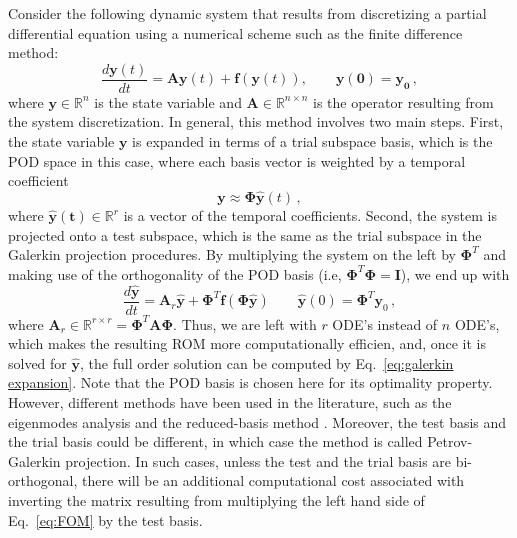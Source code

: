 \documentclass[]{interact}
\theoremstyle{plain}%
\theoremstyle{definition}
\theoremstyle{remark}
\begin{document}
Consider the following dynamic system that results from discretizing a partial differential equation using a numerical scheme such as the finite difference method:
\begin{equation}
\frac{d\mathbf{y}(t)}{dt} = \mathbf{A}\mathbf{y}(t) + \mathbf{f}(\mathbf{y}(t)),  \quad\quad \mathbf{y(0) = \mathbf{y_0}} \, ,
\label{eq:FOM}
\end{equation}
where $\mathbf{y} \in \mathbb{R}^{n}$ is the state variable and $\mathbf{A} \in \mathbb{R}^{n\times n}$ is the operator resulting from the system discretization.
In general, this method involves two main steps. 
First, the state variable $\mathbf{y}$ is expanded in terms of a trial subspace basis, which is the POD space in this case, where each basis vector is weighted by a temporal coefficient
\begin{equation}
\mathbf{y} \approx \mathbf{\Phi} \hat{\mathbf{y}}(t) \, ,
\label{eq:galerkin expansion}
\end{equation}
where $\mathbf{\hat{y}(t)} \in \mathbb{R}^{r}$ is a vector of the temporal coefficients.
Second, the system is projected onto a test subspace, which is the same as the trial subspace in the Galerkin projection procedures.
By multiplying the system on the left by $\mathbf{\Phi}^T$ and making use of the orthogonality of the POD basis (i.e, $\mathbf{\Phi}^T\mathbf{\Phi} = \mathbf{I}$), we end up with 
\begin{equation}
\frac{d\mathbf{\hat{y}}}{dt} = \mathbf{A}_r\mathbf{\hat{y}} + \mathbf{\Phi}^T\mathbf{f}(\mathbf{\Phi}\mathbf{\hat{y}}) \qquad \mathbf{\hat{y}}(0) = \mathbf{\Phi}^T\mathbf{y}_0 \, ,
\label{eq:ROM}
\end{equation}
where $\mathbf{A}_r \in \mathbb{R}^{r\times r} = \mathbf{\Phi}^T\mathbf{A}\mathbf{\Phi}.$
Thus, we are left with  $r$ ODE's instead of $n$ ODE's, which makes the resulting ROM more computationally efficien, and, once it is solved for $\mathbf{\hat{y}}$, the full order solution can be computed by Eq.~\ref{eq:galerkin expansion}.
Note that the POD basis is chosen here for its optimality property.
However, different methods have been used in the literature, such as the eigenmodes analysis and the reduced-basis method \cite{rozza2008reduced, hesthaven2016certified, veroy2003posteriori}.
Moreover, the test basis and the trial basis could be different, in which case the method is called Petrov-Galerkin projection.
In such cases, unless the test and the trial basis are bi-orthogonal, there will be an additional computational cost associated with inverting the matrix resulting from multiplying the left hand side of Eq.~\ref{eq:FOM} by the test basis.
\end{document}
